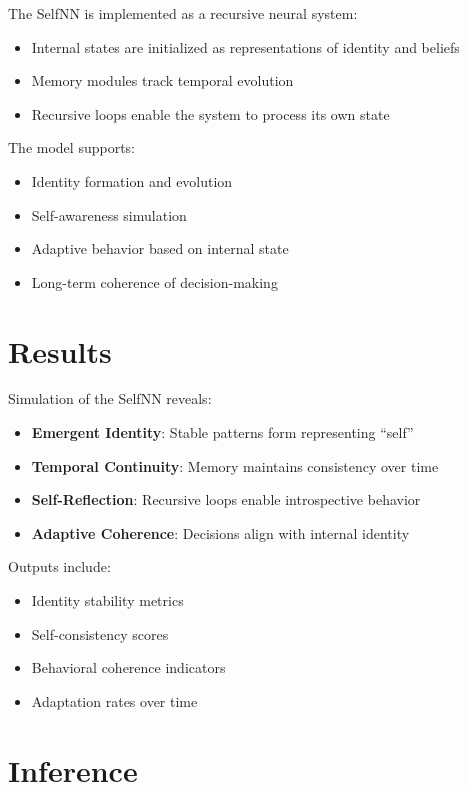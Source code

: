 \documentclass[12pt]{article}
\begin{document}
The SelfNN is implemented as a recursive neural system:

\begin{itemize}
\item Internal states are initialized as representations of identity and beliefs
\item Memory modules track temporal evolution
\item Recursive loops enable the system to process its own state
\end{itemize}

The model supports:

\begin{itemize}
\item Identity formation and evolution
\item Self-awareness simulation
\item Adaptive behavior based on internal state
\item Long-term coherence of decision-making
\end{itemize}

\section{Results}

Simulation of the SelfNN reveals:

\begin{itemize}
\item \textbf{Emergent Identity}: Stable patterns form representing “self”
\item \textbf{Temporal Continuity}: Memory maintains consistency over time
\item \textbf{Self-Reflection}: Recursive loops enable introspective behavior
\item \textbf{Adaptive Coherence}: Decisions align with internal identity
\end{itemize}

Outputs include:

\begin{itemize}
\item Identity stability metrics
\item Self-consistency scores
\item Behavioral coherence indicators
\item Adaptation rates over time
\end{itemize}

\section{Inference}
\end{document}
